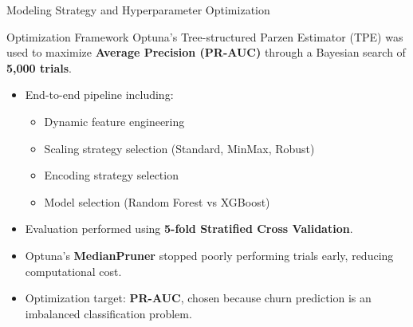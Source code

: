 \begin{frame}{Modeling Strategy and Hyperparameter Optimization}

\begin{block}{Optimization Framework}
Optuna's Tree-structured Parzen Estimator (TPE) was used to maximize
\textbf{Average Precision (PR-AUC)} through a Bayesian search of
\textbf{5,000 trials}.
\end{block}

\begin{itemize}
    \item End-to-end pipeline including:
    \begin{itemize}
        \item Dynamic feature engineering
        \item Scaling strategy selection (Standard, MinMax, Robust)
        \item Encoding strategy selection
        \item Model selection (Random Forest vs XGBoost)
    \end{itemize}

    \item Evaluation performed using
    \textbf{5-fold Stratified Cross Validation}.

    \item Optuna's \textbf{MedianPruner} stopped poorly performing trials early,
    reducing computational cost.

    \item Optimization target:
    \textbf{PR-AUC}, chosen because churn prediction is an imbalanced classification problem.
\end{itemize}

\end{frame}

